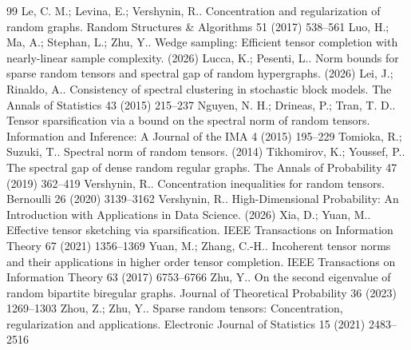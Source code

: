 \documentclass[10pt,a4paper]{amsart}
\numberwithin{equation}{section}
\begin{document}
\begin{thebibliography}{99}
 Le, C. M.; Levina, E.; Vershynin, R.. Concentration and regularization of random graphs. Random Structures \& Algorithms 51 (2017) 538--561
 Luo, H.; Ma, A.; Stephan, L.; Zhu, Y.. Wedge sampling: Efficient tensor completion with nearly-linear sample complexity. (2026)
 Lucca, K.; Pesenti, L.. Norm bounds for sparse random tensors and spectral gap of random hypergraphs. (2026)
 Lei, J.; Rinaldo, A.. Consistency of spectral clustering in stochastic block models. The Annals of Statistics 43 (2015) 215--237
 Nguyen, N. H.; Drineas, P.; Tran, T. D.. Tensor sparsification via a bound on the spectral norm of random tensors. Information and Inference: A Journal of the IMA 4 (2015) 195--229
 Tomioka, R.; Suzuki, T.. Spectral norm of random tensors. (2014)
 Tikhomirov, K.; Youssef, P.. The spectral gap of dense random regular graphs. The Annals of Probability 47 (2019) 362--419
 Vershynin, R.. Concentration inequalities for random tensors. Bernoulli 26 (2020) 3139--3162
 Vershynin, R.. High-Dimensional Probability: An Introduction with Applications in Data Science. (2026)
 Xia, D.; Yuan, M.. Effective tensor sketching via sparsification. IEEE Transactions on Information Theory 67 (2021) 1356--1369
 Yuan, M.; Zhang, C.-H.. Incoherent tensor norms and their applications in higher order tensor completion. IEEE Transactions on Information Theory 63 (2017) 6753--6766
 Zhu, Y.. On the second eigenvalue of random bipartite biregular graphs. Journal of Theoretical Probability 36 (2023) 1269--1303
 Zhou, Z.; Zhu, Y.. Sparse random tensors: Concentration, regularization and applications. Electronic Journal of Statistics 15 (2021) 2483--2516
\end{thebibliography}
\end{document}
